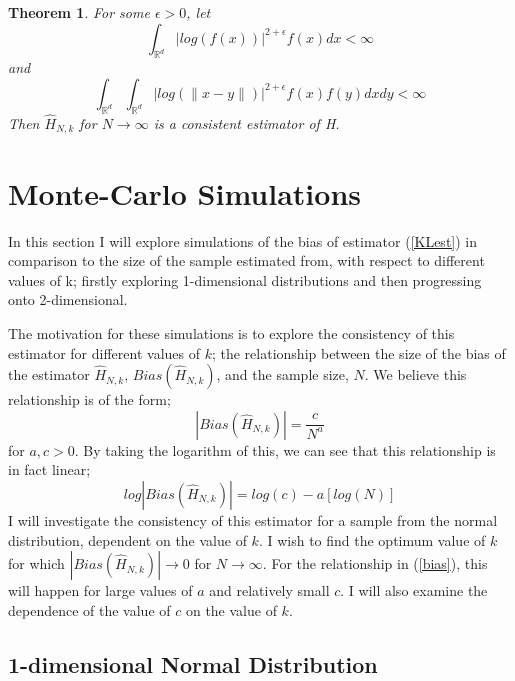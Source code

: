 \documentclass{article}
\newtheorem{theorem}{Theorem}
\begin{document}
\begin{theorem} \label{Paper1Thm2-Consistency}
For some $\epsilon > 0$, let
\begin{equation}
\int_{\mathbb{R}^{d}} | log(f(x))|^{2 + \epsilon} f(x) dx < \infty
\end{equation}
and
\begin{equation}
\int_{\mathbb{R}^{d}} \int_{\mathbb{R}^{d}} | log(\|x-y\|)|^{2+ \epsilon} f(x) f(y) dx dy < \infty
\end{equation}
Then $\hat{H}_{N, k}$ for $N \to \infty$ is a consistent estimator of H.
\end{theorem}


\section{Monte-Carlo Simulations}

In this section I will explore simulations of the bias of estimator (\ref{KLest}) in comparison to the size of the sample estimated from, with respect to different values of k; firstly exploring 1-dimensional distributions and then progressing onto 2-dimensional.

The motivation for these simulations is to explore the consistency of this estimator for different values of $k$; the relationship between the size of the bias of the estimator $\hat{H}_{N, k}$, $Bias(\hat{H}_{N, k})$,  and the sample size, $N$. We believe this relationship is of the form;
\begin{equation} \label{bias}
|Bias(\hat{H}_{N, k})| = \frac{c}{N^a}
\end{equation}
for $a, c > 0$. By taking the logarithm of this, we can see that this relationship is in fact linear;
\begin{equation} \label{logbias}
log|Bias(\hat{H}_{N, k})| = log(c) - a [log(N)]
\end{equation}
I will investigate the consistency of this estimator for a sample from the normal distribution, dependent on the value of $k$. I wish to find the optimum value of $k$ for which $|Bias(\hat{H}_{N, k})| \to 0$ for $N \to \infty$. For the relationship in (\ref{bias}), this will happen for large values of $a$ and relatively small $c$. I will also examine the dependence of the value of $c$ on the value of $k$.


\subsection{1-dimensional Normal Distribution}
\end{document}
